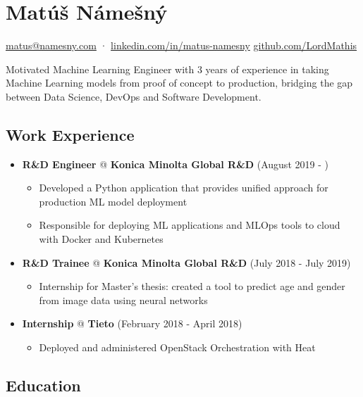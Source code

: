 \documentclass[a4,12pt]{article}
\begin{document}
\section*{Matúš Námešný}

\begin{center}
\href{mailto:matus@namesny.com}{matus@namesny.com} · 
\href{https://www.linkedin.com/in/matus-namesny/}{linkedin.com/in/matus-namesny}
\href{https://www.github.com/LordMathis}{github.com/LordMathis}
\end{center}

 Motivated Machine Learning Engineer with 3 years of experience in taking Machine Learning models from proof of concept to production, bridging the gap between Data Science, DevOps and Software Development.


\subsection*{Work Experience}\label{work}

\begin{itemize}
\item
  \textbf{R\&D Engineer} @ \textbf{Konica Minolta Global R\&D} \hfill (August 2019 - )
  \begin{itemize}
      \item Developed a Python application that provides unified approach for production ML model deployment
      \item Responsible for deploying ML applications and MLOps tools to cloud with Docker and Kubernetes
  \end{itemize}
\item
  \textbf{R\&D Trainee} @ \textbf{Konica Minolta Global R\&D} \hfill (July 2018 - July 2019)
  \begin{itemize}
      \item Internship for Master's thesis: created a tool to predict age and gender from image data using neural networks
  \end{itemize}
\item
  \textbf{Internship} @ \textbf{Tieto} \hfill (February 2018 - April 2018)
  \begin{itemize}
      \item Deployed and administered OpenStack Orchestration with Heat
  \end{itemize}
\end{itemize}

\subsection*{Education}\label{education}
\end{document}
